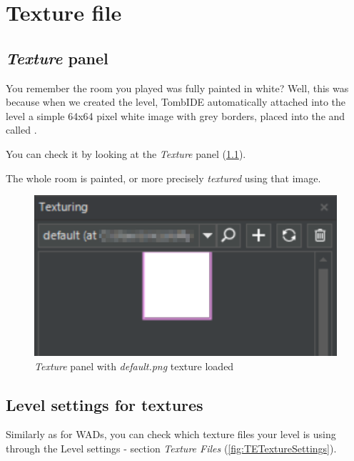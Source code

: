 \chapter{Texture file}

\section {\emph{Texture} panel}

You remember the room you played was fully painted in white? Well, this was because when we created the level, TombIDE automatically attached into the level a simple 64x64 pixel white image with grey borders, placed into the  and called .
\par You can check it by looking at the \emph{Texture} panel (\ref{fig:TEDefaultTexture}).
\par The whole room is painted, or more precisely \emph{textured} using that image.

\begin{figure}
    \centering
     \includegraphics[width=1\textwidth]{screenshots/1003.png}
     \caption{\emph{Texture} panel with \emph{default.png} texture loaded}
     \label{fig:TEDefaultTexture} 
\end{figure}

\section {Level settings for textures}

Similarly as for WADs, you can check which texture files your level is using through the Level settings - section \emph{Texture Files} (\ref{fig:TETextureSettings}).


